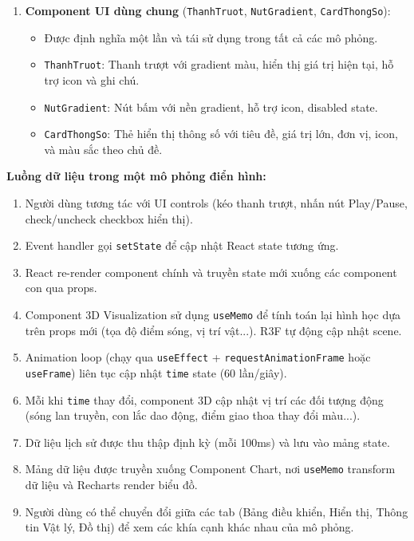 \begin{enumerate}
    \item \textbf{Component UI dùng chung} (\texttt{ThanhTruot}, \texttt{NutGradient}, \texttt{CardThongSo}):
    \begin{itemize}
        \item Được định nghĩa một lần và tái sử dụng trong tất cả các mô phỏng.
        \item \texttt{ThanhTruot}: Thanh trượt với gradient màu, hiển thị giá trị hiện tại, hỗ trợ icon và ghi chú.
        \item \texttt{NutGradient}: Nút bấm với nền gradient, hỗ trợ icon, disabled state.
        \item \texttt{CardThongSo}: Thẻ hiển thị thông số với tiêu đề, giá trị lớn, đơn vị, icon, và màu sắc theo chủ đề.
    \end{itemize}
\end{enumerate}

\textbf{Luồng dữ liệu trong một mô phỏng điển hình:}

\begin{enumerate}
    \item Người dùng tương tác với UI controls (kéo thanh trượt, nhấn nút Play/Pause, check/uncheck checkbox hiển thị).
    \item Event handler gọi \texttt{setState} để cập nhật React state tương ứng.
    \item React re-render component chính và truyền state mới xuống các component con qua props.
    \item Component 3D Visualization sử dụng \texttt{useMemo} để tính toán lại hình học dựa trên props mới (tọa độ điểm sóng, vị trí vật...). R3F tự động cập nhật scene.
    \item Animation loop (chạy qua \texttt{useEffect} + \texttt{requestAnimationFrame} hoặc \texttt{useFrame}) liên tục cập nhật \texttt{time} state (60 lần/giây).
    \item Mỗi khi \texttt{time} thay đổi, component 3D cập nhật vị trí các đối tượng động (sóng lan truyền, con lắc dao động, điểm giao thoa thay đổi màu...).
    \item Dữ liệu lịch sử được thu thập định kỳ (mỗi 100ms) và lưu vào mảng state.
    \item Mảng dữ liệu được truyền xuống Component Chart, nơi \texttt{useMemo} transform dữ liệu và Recharts render biểu đồ.
    \item Người dùng có thể chuyển đổi giữa các tab (Bảng điều khiển, Hiển thị, Thông tin Vật lý, Đồ thị) để xem các khía cạnh khác nhau của mô phỏng.
\end{enumerate}

